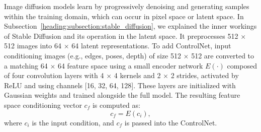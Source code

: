 Image diffusion models learn by progressively denoising and generating samples within the training domain, which can occur in pixel space or latent space. In Subsection~\ref{heading:subsection:stable_diffusion}, we explained the inner workings of Stable Diffusion and its operation in the latent space. It preprocesses 512 $\times$ 512 images into 64 $\times$ 64 latent representations. To add ControlNet, input conditioning images (e.g., edges, poses, depth) of size 512 $\times$ 512 are converted to a matching 64 $\times$ 64 feature space using a small encoder network $E(\cdot)$ composed of four convolution layers with 4 $\times$ 4 kernels and 2 $\times$ 2 strides, activated by ReLU and using channels [16, 32, 64, 128]. These layers are initialized with Gaussian weights and trained alongside the full model. The resulting feature space conditioning vector $c_f$ is computed as:
\[
    c_f = E(c_i),
\]
where $c_i$ is the input condition, and $c_f$ is passed into the ControlNet.

